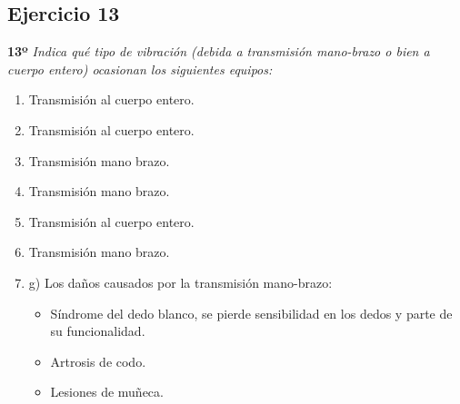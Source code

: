 \documentclass{article}
\begin{document}
      \subsection{Ejercicio 13}

        \textbf{13º} \textit{Indica qué tipo de vibración (debida a transmisión mano-brazo o bien a cuerpo entero) ocasionan los siguientes equipos:}
        \begin{enumerate}[label=(\alph*)]
          \item Transmisión al cuerpo entero.
          \item Transmisión al cuerpo entero. 
          \item Transmisión mano brazo.
          \item Transmisión mano brazo.
          \item Transmisión al cuerpo entero. 
          \item Transmisión mano brazo.
          \item g) Los daños causados por la transmisión mano-brazo:
          \begin{itemize}
            \item Síndrome del dedo blanco, se pierde sensibilidad en los dedos y parte de su funcionalidad.
            \item Artrosis de codo.
            \item Lesiones de muñeca.
          \end{itemize}
        \end{enumerate}
\end{document}
